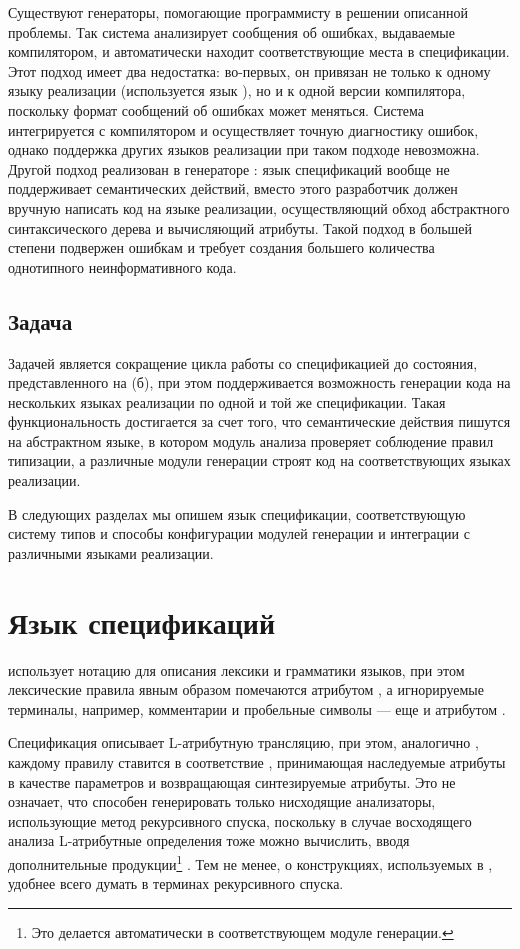 Существуют генераторы, помогающие программисту в решении описанной проблемы. Так система  \cite{???} анализирует сообщения об ошибках, выдаваемые компилятором, и автоматически находит соответствующие места в спецификации. Этот подход имеет два недостатка: во-первых, он привязан не только к одному языку реализации (используется язык ), но и к одной версии компилятора, поскольку формат сообщений об ошибках может меняться. Система  \cite{???} интегрируется с компилятором  и осуществляет точную диагностику ошибок, однако поддержка других языков реализации при таком подходе невозможна. Другой подход реализован в генераторе  \cite{???}: язык спецификаций вообще не поддерживает семантических действий, вместо этого разработчик должен вручную написать код на языке реализации, осуществляющий обход абстрактного синтаксического дерева и вычисляющий атрибуты. Такой подход в большей степени подвержен ошибкам и требует создания большего количества однотипного неинформативного кода.

\section{Задача \ATF{}}

Задачей \ATF{} является сокращение цикла работы со спецификацией до состояния, представленного на  (б), при этом поддерживается возможность генерации кода на нескольких языках реализации по одной и той же спецификации.
Такая функциональность достигается за счет того, что семантические действия пишутся на абстрактном языке, в котором модуль анализа проверяет соблюдение правил типизации, а различные модули генерации строят код на соответствующих языках реализации.

В следующих разделах мы опишем язык спецификации, соответствующую систему типов и способы конфигурации модулей генерации и интеграции с различными языками реализации.

\chapter{Язык спецификаций \ATF{}}

\ATF{} использует нотацию \GRM{} для описания лексики и грамматики языков, при этом лексические правила явным образом помечаются атрибутом , а игнорируемые терминалы, например, комментарии и пробельные символы --- еще и атрибутом .

Спецификация описывает L-атрибутную трансляцию, при этом, аналогично , каждому правилу ставится в соответствие , принимающая наследуемые атрибуты в качестве параметров и возвращающая синтезируемые атрибуты. Это не означает, что \ATF{} способен генерировать только нисходящие анализаторы, использующие метод рекурсивного спуска, поскольку в случае восходящего анализа L-атрибутные определения тоже можно вычислить, вводя дополнительные продукции\footnote{Это делается автоматически в соответствующем модуле генерации.} \cite{???}. Тем не менее, о конструкциях, используемых в \ATF{}, удобнее всего думать в терминах рекурсивного спуска.

